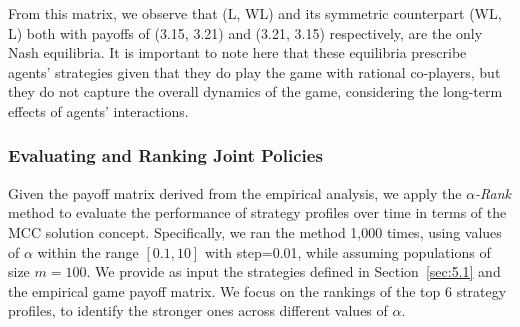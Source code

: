 \begin{flushleft}
\begin{flushleft}
        From this matrix, we observe that (L, WL) and its symmetric counterpart (WL, L) both with payoffs of (3.15, 3.21) and (3.21, 3.15) respectively, are the only Nash equilibria. It is important to note here that these equilibria prescribe agents' strategies given that they do play the game with rational co-players, but they do not capture the overall dynamics of the game, considering the long-term effects of agents' interactions.

    \end{flushleft}

    \subsubsection{Evaluating and Ranking Joint Policies}

    \begin{flushleft}

        Given the payoff matrix derived from the empirical analysis, we apply the \emph{$\alpha$-Rank} method to evaluate the performance of strategy profiles over time in terms of the MCC solution concept. Specifically, we ran the method 1,000 times, using values of $\alpha$ within the range $[0.1, 10]$ with step=0.01, while assuming populations of size $m=100$. We provide as input the strategies defined in Section~\ref{sec:5.1} and the empirical game payoff matrix. We focus on the rankings of the top 6 strategy profiles, to identify the stronger ones across different values of $\alpha$.\\~\\


\end{flushleft}
\end{flushleft}
